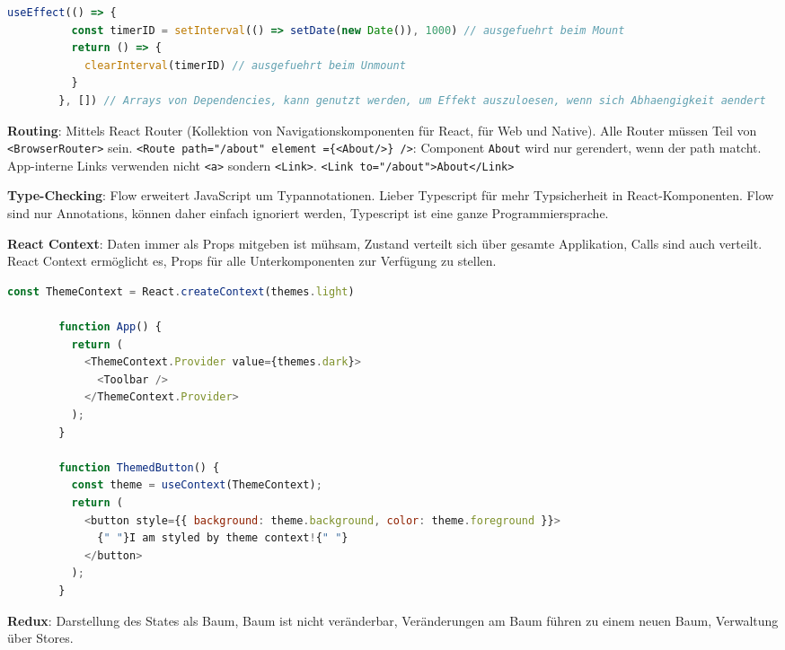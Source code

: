 \documentclass[10pt,landscape]{article}
\begin{document}
\begin{multicols}{2}
        \begin{lstlisting}[language=JavaScript]
        useEffect(() => {
          const timerID = setInterval(() => setDate(new Date()), 1000) // ausgefuehrt beim Mount
          return () => {
            clearInterval(timerID) // ausgefuehrt beim Unmount
          }
        }, []) // Arrays von Dependencies, kann genutzt werden, um Effekt auszuloesen, wenn sich Abhaengigkeit aendert
        \end{lstlisting}

        \textbf{Routing}: Mittels React Router (Kollektion von Navigationskomponenten für React, für Web und Native).
        Alle Router müssen Teil von \lstinline{<BrowserRouter>} sein.
        \lstinline[mathescape]!<Route path="/about" element ={<About/>} />!: Component \lstinline{About} wird nur gerendert, wenn der path matcht.
        App-interne Links verwenden nicht \lstinline{<a>} sondern \lstinline{<Link>}. \lstinline[mathescape]!<Link to="/about">About</Link>!

        \textbf{Type-Checking}: Flow erweitert JavaScript um Typannotationen.
        Lieber Typescript für mehr Typsicherheit in React-Komponenten.
        Flow sind nur Annotations, können daher einfach ignoriert werden, Typescript ist eine ganze Programmiersprache.

        \textbf{React Context}: Daten immer als Props mitgeben ist mühsam, Zustand verteilt sich über gesamte Applikation, Calls sind auch verteilt.
        React Context ermöglicht es, Props für alle Unterkomponenten zur Verfügung zu stellen.

        \begin{lstlisting}[language=JavaScript]
        const ThemeContext = React.createContext(themes.light)

        function App() {
          return (
            <ThemeContext.Provider value={themes.dark}>
              <Toolbar />
            </ThemeContext.Provider>
          );
        }

        function ThemedButton() {
          const theme = useContext(ThemeContext);
          return (
            <button style={{ background: theme.background, color: theme.foreground }}>
              {" "}I am styled by theme context!{" "}
            </button>
          );
        }
        \end{lstlisting}

        \textbf{Redux}: Darstellung des States als Baum, Baum ist nicht veränderbar, Veränderungen am Baum führen zu einem neuen Baum, Verwaltung über Stores.


\end{multicols}
\end{document}
